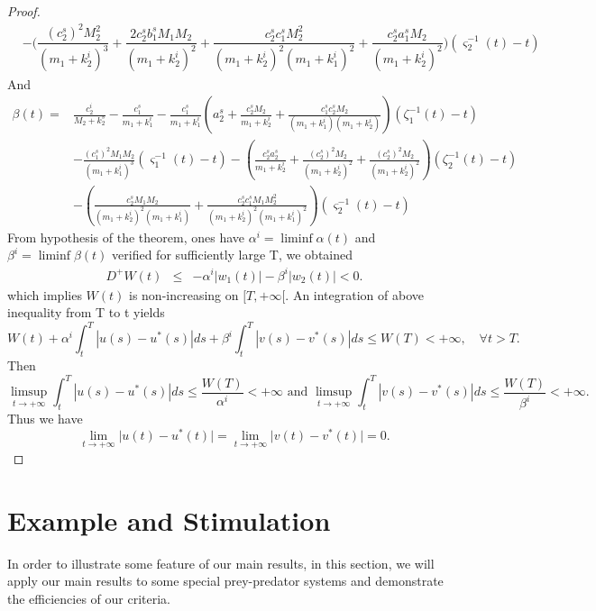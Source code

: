 \documentclass[[a4paper,10pt]{article}
\begin{document}
\begin{proof}
\begin{equation}
\begin{aligned}
&-\bigg(\dfrac{(c_2^s)^2M_2^2}{(m_1+k_2^i)^3}+\dfrac{2c_2^sb_1^sM_1M_2}{(m_1+k_2^i)^2}+\dfrac{c_2^sc_1^sM_2^2}{(m_1+k_2^i)^2(m_1+k_1^i)^2}+\dfrac{c_2^sa_1^sM_2}{(m_1+k_2^i)^2}\bigg)(\varsigma_2^{-1}(t)-t)
\end{aligned}
\end{equation}
And 
\begin{equation}
\label{beta}\begin{aligned}
\beta(t)=& \frac{c_2 ^i}{M_2+k_2^s}- \frac{c_1^s}{m_1+k_1^i}-\frac{c_1^s}{m_1+k_1^i}\left(a_2^s+\frac{c_2^sM_2}{m_1+k_2^i}+\frac{c_1^sc_2^sM_2}{(m_1+k_1^i)(m_1+k_2^i)}\right)(\zeta_1^{-1}(t)-t)\\
&-\frac{(c_1^s)^2M_1M_2}{(m_1+k_1^i)^3}(\varsigma_1^{-1}(t)-t)-\left(\frac{c_2^sa_2^s}{m_1+k_2^i}+ \frac{(c_2^s)^2M_2}{(m_1+k_2^i)^2}+\frac{(c_2^s)^2M_2}{(m_1+k_2^i)^2}\right)(\zeta_2^{-1}(t)-t)\\
&-\left(\frac{c_2^sM_1M_2}{(m_1+k_2^i)^2(m_1+k_1^i)}+\frac{c_2^sc_1^sM_1M_2^2}{(m_1+k_2^i)^2(m_1+k_1^i)^2}\right)(\varsigma_2^{-1}(t)-t)
\end{aligned}
\end{equation}
From  hypothesis of the theorem, ones have  $\alpha^i=\liminf \alpha(t)$ and $\beta^i=\liminf \beta(t)$ verified for sufficiently large T, we obtained 
$$\begin{array}{lll}
D^+W  (t)&\leq&-\alpha^i\big|w_1(t)\big|-\beta^i\big|w_2(t)\big|<0.
\end{array}$$  
which implies $W (t)$ is non-increasing on $[T, +\infty[$. An integration of above inequality from T to t yields
$$ W (t) + \alpha^i \int^T_t |u(s)- u^*(s)|ds + \beta^i \int^T_t |v(s)-v^*(s)|ds \leq W(T) < +\infty,\quad \forall t > T.$$
Then $$\limsup_{t\rightarrow +\infty} \int^T_t |u(s)- u^*(s)|ds \leq \dfrac{W(T)}{\alpha^i} < +\infty \text{ and }\limsup_{t\rightarrow +\infty} \int^T_t |v(s)-v^*(s)|ds \leq \dfrac{W(T)}{\beta^i} < +\infty.$$
Thus we have 
$$\lim_{t\rightarrow +\infty} \big|u(t)-u^*(t)\big|=\lim_{t\rightarrow +\infty} \big|v(t)-v^*(t)\big|=0.$$
 \end{proof}
 \section{Example and Stimulation}
\hspace{1cm} In order to illustrate some feature of our main results, in this section, we will
apply our main results to some special prey-predator systems and demonstrate the efficiencies of our criteria.
\end{document}
